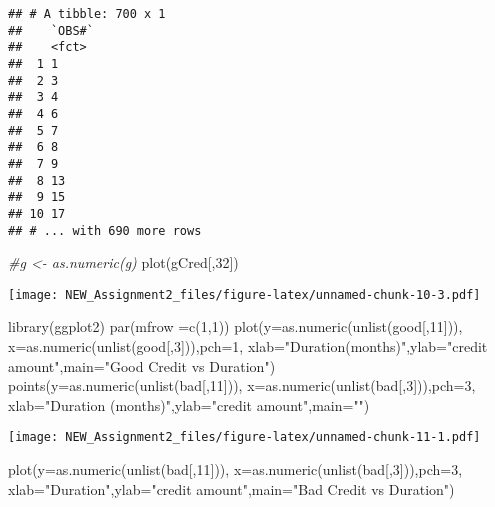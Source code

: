 \documentclass[
]{article}
\newenvironment{Shaded}{\begin{snugshade}}{\end{snugshade}}
\newcommand{\AttributeTok}[1]{\textcolor[rgb]{0.77,0.63,0.00}{#1}}
\newcommand{\CommentTok}[1]{\textcolor[rgb]{0.56,0.35,0.01}{\textit{#1}}}
\newcommand{\DecValTok}[1]{\textcolor[rgb]{0.00,0.00,0.81}{#1}}
\newcommand{\FunctionTok}[1]{\textcolor[rgb]{0.00,0.00,0.00}{#1}}
\newcommand{\NormalTok}[1]{#1}
\newcommand{\StringTok}[1]{\textcolor[rgb]{0.31,0.60,0.02}{#1}}
\begin{document}
\begin{verbatim}
## # A tibble: 700 x 1
##    `OBS#`
##    <fct> 
##  1 1     
##  2 3     
##  3 4     
##  4 6     
##  5 7     
##  6 8     
##  7 9     
##  8 13    
##  9 15    
## 10 17    
## # ... with 690 more rows
\end{verbatim}

\begin{Shaded}
\begin{Highlighting}[]
\CommentTok{\#g \textless{}{-} as.numeric(g)}
\FunctionTok{plot}\NormalTok{(gCred[,}\DecValTok{32}\NormalTok{])}
\end{Highlighting}
\end{Shaded}

\texttt{[image: NEW\_Assignment2\_files/figure-latex/unnamed-chunk-10-3.pdf]}

\begin{Shaded}
\begin{Highlighting}[]
\FunctionTok{library}\NormalTok{(ggplot2)}
\FunctionTok{par}\NormalTok{(}\AttributeTok{mfrow =}\FunctionTok{c}\NormalTok{(}\DecValTok{1}\NormalTok{,}\DecValTok{1}\NormalTok{))}
\FunctionTok{plot}\NormalTok{(}\AttributeTok{y=}\FunctionTok{as.numeric}\NormalTok{(}\FunctionTok{unlist}\NormalTok{(good[,}\DecValTok{11}\NormalTok{])),}
    \AttributeTok{x=}\FunctionTok{as.numeric}\NormalTok{(}\FunctionTok{unlist}\NormalTok{(good[,}\DecValTok{3}\NormalTok{])),}\AttributeTok{pch=}\DecValTok{1}\NormalTok{,}
    \AttributeTok{xlab=}\StringTok{"Duration(months)"}\NormalTok{,}\AttributeTok{ylab=}\StringTok{"credit amount"}\NormalTok{,}\AttributeTok{main=}\StringTok{"Good Credit vs Duration"}\NormalTok{)}
\FunctionTok{points}\NormalTok{(}\AttributeTok{y=}\FunctionTok{as.numeric}\NormalTok{(}\FunctionTok{unlist}\NormalTok{(bad[,}\DecValTok{11}\NormalTok{])),}
\AttributeTok{x=}\FunctionTok{as.numeric}\NormalTok{(}\FunctionTok{unlist}\NormalTok{(bad[,}\DecValTok{3}\NormalTok{])),}\AttributeTok{pch=}\DecValTok{3}\NormalTok{,}
\AttributeTok{xlab=}\StringTok{"Duration (months)"}\NormalTok{,}\AttributeTok{ylab=}\StringTok{"credit amount"}\NormalTok{,}\AttributeTok{main=}\StringTok{""}\NormalTok{)}
\end{Highlighting}
\end{Shaded}

\texttt{[image: NEW\_Assignment2\_files/figure-latex/unnamed-chunk-11-1.pdf]}

\begin{Shaded}
\begin{Highlighting}[]
\FunctionTok{plot}\NormalTok{(}\AttributeTok{y=}\FunctionTok{as.numeric}\NormalTok{(}\FunctionTok{unlist}\NormalTok{(bad[,}\DecValTok{11}\NormalTok{])),}
    \AttributeTok{x=}\FunctionTok{as.numeric}\NormalTok{(}\FunctionTok{unlist}\NormalTok{(bad[,}\DecValTok{3}\NormalTok{])),}\AttributeTok{pch=}\DecValTok{3}\NormalTok{,}
    \AttributeTok{xlab=}\StringTok{"Duration"}\NormalTok{,}\AttributeTok{ylab=}\StringTok{"credit amount"}\NormalTok{,}\AttributeTok{main=}\StringTok{"Bad Credit vs Duration"}\NormalTok{)}
\end{Highlighting}
\end{Shaded}
\end{document}
